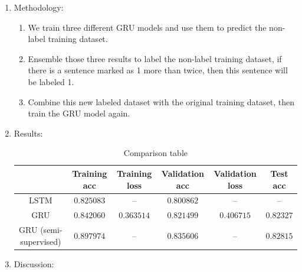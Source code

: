 \documentclass[a4paper,11pt]{article}
\begin{document}
\begin{enumerate}
\begin{enumerate}
		\item Methodology:

			\begin{enumerate}
				\item We train three different GRU models and use them to predict the non-label training dataset.

				\item Ensemble those three results to label the non-label training dataset, if there is a sentence marked as 1 more than twice, then this sentence will be labeled 1.

				\item Combine this new labeled dataset with the original training dataset, then train the GRU model again.\\
			\end{enumerate}

		\item Results:\\

			\begin{table}[htp]
				\begin{center}
					\begin{tabular}{ | c | c | c | c | c | c |}
					  	\hline
				  		& Training acc & Training loss & Validation acc & Validation loss & Test acc\\[0.5ex] 
				  		\hline \hline
				  		LSTM & $0.825083$ & -- & $0.800862$ & -- & --\\[0.2ex]
				  		\hline
				  		GRU & $0.842060$ & $0.363514$ & $0.821499$ & $0.406715$ & $0.82327$\\[0.2ex]
				  		\hline
				  		GRU (semi-supervised) & $0.897974$ & -- & $0.835606$ & -- & $0.82815$ \\[0.2ex]
				  		\hline
					\end{tabular}
					\caption{Comparison table}
				\end{center}
			\end{table}

		\item Discussion:\\

	\end{enumerate}

\end{enumerate}
\end{document}
